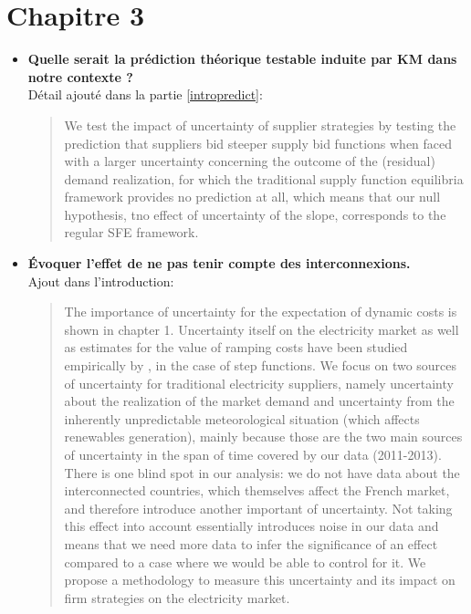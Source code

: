\documentclass{article}
\begin{document}
\section{Chapitre 3}
\begin{itemize}
\item \textbf{Quelle serait la prédiction théorique testable induite par KM dans notre contexte ? }\\

Détail ajouté dans la partie \ref{intropredict}:

\begin{quote}
We test the impact of uncertainty of supplier strategies by testing the prediction that suppliers bid steeper supply bid functions when faced with a larger uncertainty concerning the outcome of the (residual) demand realization, for which the traditional supply function equilibria framework provides no prediction at all, which means that our null hypothesis, tno effect of uncertainty of the slope, corresponds to the regular SFE framework.
\end{quote}

\item \textbf{Évoquer l'effet de ne pas tenir compte des interconnexions.}\\

Ajout dans l'introduction:

\begin{quote}
The importance of uncertainty for the expectation of dynamic costs is shown in chapter 1. Uncertainty itself on the electricity market as well as estimates for the value of ramping costs have been studied empirically by \cite{wolak2007quantifying}, in the case of step functions. We focus on two sources of uncertainty for traditional electricity suppliers, namely uncertainty about the realization of the market demand and uncertainty from the inherently unpredictable meteorological situation
(which affects renewables generation), mainly because those are the two main sources of uncertainty in the span of time covered by our data (2011-2013). There is one blind spot in our analysis: we do not have data about the interconnected countries, which themselves affect the French market, and therefore introduce another important of uncertainty. Not taking this effect into account essentially introduces noise in our data and means that we need more data to infer the significance of an effect compared to a case where we would be able to control for it. We propose a methodology to measure this uncertainty and its impact on firm strategies on the electricity market. 
\end{quote}
\end{itemize}
\end{document}
